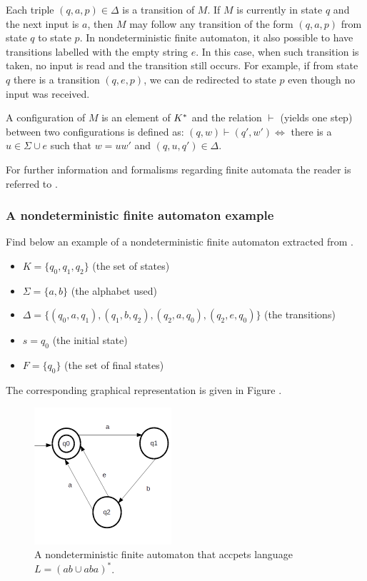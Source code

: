 Each triple $(q,a,p) \in \Delta$ is a transition of $M$. If $M$ is currently in state $q$ and the next input is $a$, then $M$ may follow any transition of the form $(q,a,p)$ from state $q$ to state $p$. In nondeterministic finite automaton, it also possible to have transitions labelled with the empty string $e$. In this case, when such transition is taken, no input is read and the transition still occurs. For example, if from state $q$ there is a transition $(q,e,p)$, we can de redirected to state $p$ even though no input was received.

A configuration of $M$ is an element of $K\time \Sigma^*$ and the relation $\vdash$ (yields one step) between two configurations is defined as: $(q,w) \vdash (q',w') \Leftrightarrow$ there is a $u \in \Sigma \cup {e}$ such that $w = uw'$ and $(q,u,q') \in \Delta$.

For further information and formalisms regarding finite automata the reader is referred to \cite{Lewis:98}. 

\subsubsection{A nondeterministic finite automaton example}

Find below an example of a nondeterministic finite automaton extracted from \cite{Lewis:98}.

\begin{itemize}
\item $K = \{q_0, q_1, q_2\}$ (the set of states)

\item $\Sigma = \{a, b\}$ (the alphabet used)

\item $\Delta = \{(q_0,a,q_1),(q_1,b,q_2),(q_2,a,q_0),(q_2,e,q_0)\}$ (the transitions)

\item $s = q_0$ (the initial state)

\item $F = \{q_0\}$ (the set of final states)
\end{itemize}

The corresponding graphical representation is given in Figure \cite{fig:nfa1}.

\begin{figure}[htb]
\centering
\includegraphics[width=2in]{figuras/nfa1}
\caption{\label{fig:nfa1}A nondeterministic finite automaton that accpets language $L = (ab \cup aba)^{*}$.}
\end{figure}

